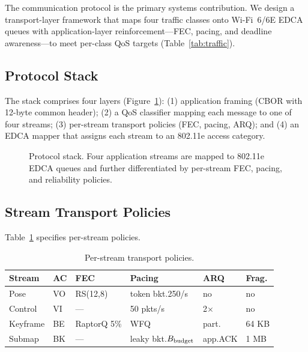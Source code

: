 \label{sec:protocol}

The communication protocol is the primary systems contribution. We design a
transport-layer framework that maps four traffic classes onto Wi-Fi~6/6E EDCA
queues with application-layer reinforcement---FEC, pacing, and deadline
awareness---to meet per-class QoS targets (Table~\ref{tab:traffic}).

\subsection{Protocol Stack}

The stack comprises four layers (Figure~\ref{fig:protocol_stack}):
(1) application framing (CBOR with 12-byte common header);
(2) a QoS classifier mapping each message to one of four streams;
(3) per-stream transport policies (FEC, pacing, ARQ); and
(4) an EDCA mapper that assigns each stream to an 802.11e access category.

\begin{figure}[t]
  \centering
  \resizebox{\columnwidth}{!}{}
  \caption{Protocol stack. Four application streams are mapped to 802.11e
  EDCA queues and further differentiated by per-stream FEC, pacing, and
  reliability policies.}
  \label{fig:protocol_stack}
\end{figure}

\subsection{Stream Transport Policies}

Table~\ref{tab:transport} specifies per-stream policies.

\begin{table}[t]
  \centering
  \caption{Per-stream transport policies.}
  \label{tab:transport}
  \footnotesize
  \setlength{\tabcolsep}{3.5pt}
  \begin{tabular}{@{}p{1.1cm}p{1.2cm}p{2.0cm}p{1.8cm}p{0.8cm}p{1.3cm}@{}}
    \toprule
    Stream & AC & FEC & Pacing & ARQ & Frag. \\
    \midrule
    Pose    & VO & RS(12,8)    & token bkt.\@ 250/s & no   & no \\
    Control & VI & ---         & 50 pkts/s          & 2$\times$ & no \\
    Keyframe& BE & RaptorQ 5\% & WFQ                & part.\@& 64 KB \\
    Submap  & BK & ---         & leaky bkt.\@ $B_{\text{budget}}$ & app.\@ ACK & 1 MB \\
    \bottomrule
  \end{tabular}
\end{table}

